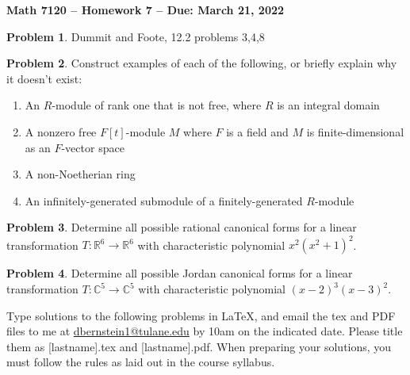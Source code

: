 \documentclass[letterpaper,11pt]{amsart}
\theoremstyle{plain}
\theoremstyle{definition}
\newtheorem{pr}{Problem}
\theoremstyle{remark}
\begin{document}
\Large

\begin{center}
{\bf Math 7120 -- Homework  7 --  Due:  March 21, 2022}
\end{center}

\normalsize

\medskip


\begin{pr}
    Dummit and Foote, 12.2 problems 3,4,8
\end{pr}





\begin{pr}
    Construct examples of each of the following, or briefly explain why it doesn't exist:
    \begin{enumerate}
        \item An $R$-module of rank one that is not free, where $R$ is an integral domain
        \item A nonzero free $F[t]$-module $M$ where $F$ is a field and $M$ is finite-dimensional as an $F$-vector space
        \item A non-Noetherian ring
        \item An infinitely-generated submodule of a finitely-generated $R$-module
    \end{enumerate}
\end{pr}


\begin{pr}
    Determine all possible rational canonical forms for a linear transformation $T: \mathbb{R}^6\rightarrow \mathbb{R}^6$ with characteristic polynomial $x^2(x^2+1)^2$.
\end{pr}

\begin{pr}
    Determine all possible Jordan canonical forms for a linear transformation $T: \mathbb{C}^5\rightarrow \mathbb{C}^5$ with characteristic polynomial $(x-2)^3(x-3)^2$.
\end{pr}






\bigskip

Type solutions to the following problems in \LaTeX, and email the tex and PDF files to me at \url{dbernstein1@tulane.edu} by 10am on the indicated date.
Please title them as [lastname].tex and [lastname].pdf.
When preparing your solutions, you must follow the rules as laid out in the course syllabus.
\end{document}
